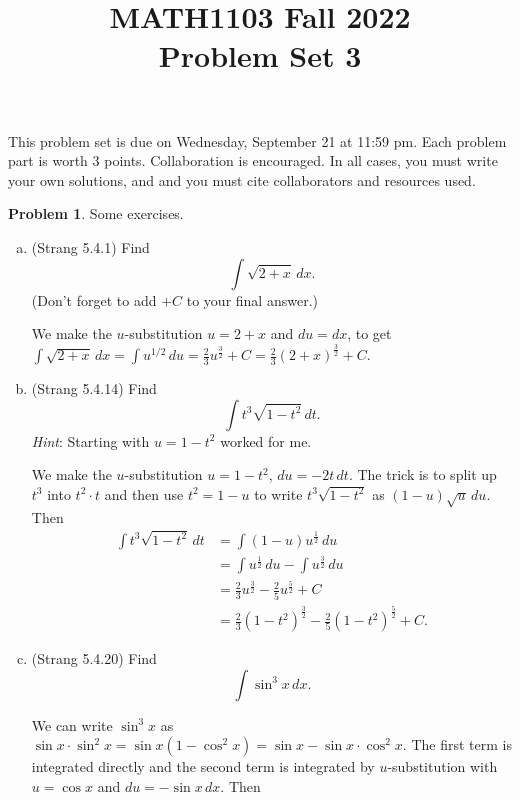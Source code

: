 \documentclass[11pt,oneside]{amsart}
\title{MATH1103 Fall 2022\\
Problem Set 3}
\theoremstyle{definition}
\newtheorem{problem}{Problem}
\begin{document}
    \maketitle
    This problem set is due on Wednesday, September 21 at 11:59 pm. Each problem part is worth 3 points. Collaboration is encouraged. In all cases, you must write your own solutions, and and you must cite collaborators and resources used.

    \begin{problem}
        Some exercises.
        \begin{enumerate}[(a)]
            \item (Strang 5.4.1) Find
            \[\int\sqrt{2+x}\,dx.\]
            (Don't forget to add $+C$ to your final answer.)
            \begin{solution}
                We make the $u$-substitution $u=2+x$ and $du=dx$, to get $\int\sqrt{2+x}\,dx=\int u^{1/2}\,du=\frac 23 u^{\frac32}+C=\frac 23 (2+x)^{\frac32}+C$.
            \end{solution}
            \item (Strang 5.4.14) Find
            \[\int t^3\sqrt{1-t^2}\,dt.\]
            \emph{Hint}: Starting with $u=1-t^2$ worked for me.
            \begin{solution}
                We make the $u$-substitution $u=1-t^2$, $du=-2t\,dt$. The trick is to split up $t^3$ into $t^2\cdot t$ and then use $t^2=1-u$ to write $t^3\sqrt{1-t^2}$ as $(1-u)\sqrt u\,du$. Then
                \[\begin{split}
                    \int t^3\sqrt{1-t^2}\,dt &= \int(1-u)u^{\frac12}\,du \\
                    &=\int u^{\frac12}\,du-\int u^{\frac32}\,du \\
                    &=\frac 23u^{\frac32}-\frac 25u^{\frac 52}+C\\
                    &=\frac23(1-t^2)^{\frac32}-\frac 25(1-t^2)^{\frac52}+C.
                \end{split}\]
            \end{solution}
            \item (Strang 5.4.20) Find
            \[\int\sin^3 x\,dx.\]
            \begin{solution}
                We can write $\sin^3 x$ as $\sin x\cdot\sin^2 x=\sin x(1-\cos^2 x)=\sin x-\sin x\cdot\cos^2 x$. The first term is integrated directly and the second term is integrated by $u$-substitution with $u=\cos x$ and $du=-\sin x\,dx$. Then
                \[\begin{split}

\end{split}\]
\end{solution}
\end{enumerate}
\end{problem}
\end{document}
